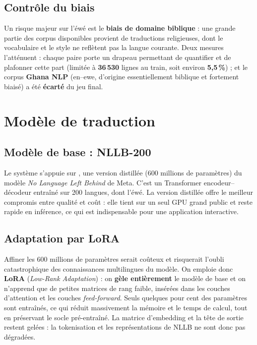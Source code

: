 \documentclass[11pt,a4paper]{article}
\begin{document}
\subsection{Contrôle du biais}
Un risque majeur sur l'éwé est le \textbf{biais de domaine biblique} : une grande partie
des corpus disponibles provient de traductions religieuses, dont le vocabulaire et le
style ne reflètent pas la langue courante. Deux mesures l'atténuent : chaque paire porte
un drapeau  permettant de quantifier et de plafonner cette part
(limitée à \textbf{36\,530} lignes au train, soit environ \textbf{5,5\,\%}) ; et le
corpus \textbf{Ghana NLP} (en–ewe, d'origine essentiellement biblique et fortement
biaisé) a été \textbf{écarté} du jeu final.

\section{Modèle de traduction}

\subsection{Modèle de base : NLLB-200}
Le système s'appuie sur \textbf{}, une version
distillée (600 millions de paramètres) du modèle \textit{No Language Left Behind} de
Meta. C'est un Transformer encodeur–décodeur entraîné sur 200 langues, dont l'éwé. La
version distillée offre le meilleur compromis entre qualité et coût : elle tient sur un
seul GPU grand public et reste rapide en inférence, ce qui est indispensable pour une
application interactive.

\subsection{Adaptation par LoRA}
Affiner les 600 millions de paramètres serait coûteux et risquerait l'oubli
catastrophique des connaissances multilingues du modèle. On emploie donc \textbf{LoRA}
(\emph{Low-Rank Adaptation}) : on \textbf{gèle entièrement} le modèle de base et on
n'apprend que de petites matrices de rang faible, insérées dans les couches d'attention
et les couches \emph{feed-forward}. Seuls quelques pour cent des paramètres sont
entraînés, ce qui réduit massivement la mémoire et le temps de calcul, tout en
préservant le socle pré-entraîné. La matrice d'embedding et la tête de sortie restent
gelées : la tokenisation et les représentations de NLLB ne sont donc pas dégradées.
\end{document}
